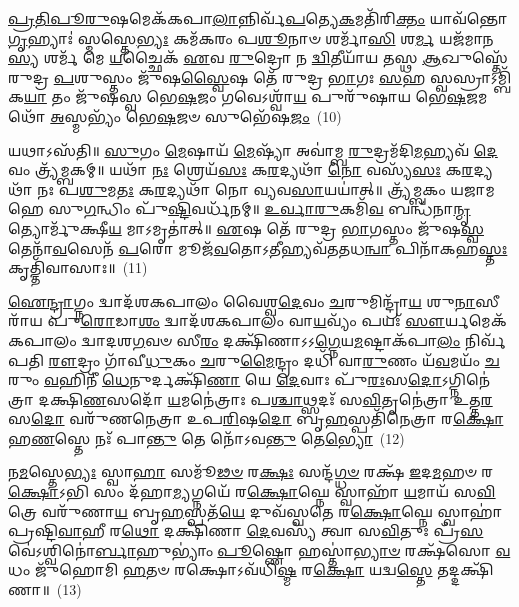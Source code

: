 {\anuvakamend[{𑌹\-\ul{𑌰𑍀} 𑌮𑌨𑍍𑌮᳴\-\ul{𑌭𑌿}\-𑌰𑌾 𑌚𑌤𑍁᳴𑌶𑍍𑌚𑌤𑍍𑌵𑌾𑌰𑌿𑍞𑌶𑌚𑍍𑌚}]}%

\-\ul{𑌪𑍍𑌰}\-\-\ul{𑌤𑌿}\-\-\ul{𑌪𑍂}\-\-\ul{𑌰𑍁}\-𑌷𑌮𑍇𑌕᳴𑌕𑌪𑌾\-\ul{𑌲𑌾}\-𑌨𑍍𑌨𑌿𑌰𑍍𑌵᳴\-\ul{𑌪}\-𑌤𑍍𑌯𑍇\-\ul{𑌕}\-𑌮𑌤𑌿᳴𑌰𑌿\-\ul{𑌕𑍍𑌤𑌂} 𑌯𑌾𑌵᳴𑌨𑍍𑌤𑍋 \ul{𑌗𑍃}\-𑌹𑍍𑌯𑌾𑌃॑ 𑌸𑍍𑌮𑌸𑍍𑌤𑍇\-\ul{𑌭𑍍𑌯𑌃} 𑌕𑌮᳴𑌕𑌰𑌂 𑌪\-\ul{𑌶𑍂}\-𑌨𑌾𑍞 𑌶𑌰𑍍𑌮𑌾᳴\-\ul{𑌸𑌿} 𑌶\-\ul{𑌰𑍍𑌮} 𑌯𑌜᳴𑌮𑌾𑌨\-\ul{𑌸𑍍𑌯} 𑌶𑌰𑍍𑌮᳴ 𑌮𑍇 \ul{𑌯}\-𑌚𑍍𑌛𑍈𑌕᳴ \ul{𑌏}\-𑌵 \ul{𑌰𑍁}\-𑌦𑍍𑌰𑍋 𑌨 \ul{𑌦𑍍𑌵𑌿}\-𑌤𑍀𑌯𑌾᳴𑌯 𑌤𑌸𑍍𑌥 \ul{𑌆}\-𑌖𑍁𑌸𑍍𑌤𑍇᳴ 𑌰𑍁𑌦𑍍𑌰 \ul{𑌪}\-𑌶𑍁𑌸𑍍𑌤𑌂 𑌜𑍁᳴𑌷\-\ul{𑌸𑍍𑌵𑍈}\-𑌷 𑌤𑍇᳴ 𑌰𑍁𑌦𑍍𑌰 \ul{𑌭𑌾}\-𑌗𑌃 \ul{𑌸}\-𑌹 𑌸𑍍𑌵𑌸𑍍𑌰𑌾\-𑌽𑌮𑍍𑌬𑌿᳴𑌕\-\ul{𑌯𑌾} 𑌤𑌂 𑌜𑍁᳴𑌷𑌸𑍍𑌵 𑌭𑍇\-\ul{𑌷}\-𑌜𑌂 𑌗𑌵𑍇\-𑌽𑌶𑍍𑌵𑌾᳴\-\ul{𑌯} 𑌪𑍁𑌰𑍁᳴𑌷𑌾𑌯 𑌭𑍇\-\ul{𑌷}\-𑌜𑌮𑌥𑍋᳴ \ul{𑌅}\-𑌸𑍍𑌮𑌭𑍍𑌯𑌂᳴ 𑌭𑍇\-\ul{𑌷}\-𑌜𑍞 𑌸𑍁𑌭𑍇᳴𑌷\-\ul{𑌜𑌂}\-~(10)

𑌯𑌥𑌾\-𑌽𑌸᳴𑌤𑌿॥ \ul{𑌸𑍁}\-𑌗𑌂 \ul{𑌮𑍇}\-𑌷𑌾𑌯᳴ \ul{𑌮𑍇}\-𑌷𑍍𑌯𑌾᳴ 𑌅𑌵𑌾॑𑌮𑍍𑌬 \ul{𑌰𑍁}\-𑌦𑍍𑌰𑌮᳴𑌦𑌿\-\ul{𑌮}\-𑌹𑍍𑌯𑌵᳴ \ul{𑌦𑍇}\-𑌵𑌂 𑌤𑍍𑌰𑍍𑌯᳴𑌮𑍍𑌬𑌕𑌮𑍍॥ 𑌯𑌥𑌾᳴ \ul{𑌨𑌃} 𑌶𑍍𑌰𑍇𑌯᳴\-\ul{𑌸𑌃} 𑌕\-\ul{𑌰}\-𑌦𑍍𑌯𑌥𑌾᳴ \ul{𑌨𑍋} 𑌵𑌸𑍍𑌯᳴\-\ul{𑌸𑌃} 𑌕\-\ul{𑌰}\-𑌦𑍍𑌯𑌥𑌾᳴ 𑌨𑌃 𑌪\-\ul{𑌶𑍁}\-𑌮\-\ul{𑌤𑌃} 𑌕\-\ul{𑌰}\-𑌦𑍍𑌯𑌥𑌾᳴ 𑌨𑍋 𑌵𑍍𑌯𑌵\-\ul{𑌸𑌾}\-𑌯𑌯𑌾॑𑌤𑍍॥ 𑌤𑍍𑌰𑍍𑌯᳴𑌮𑍍𑌬𑌕𑌂 𑌯𑌜𑌾𑌮𑌹𑍇 𑌸𑍁\-\ul{𑌗}\-𑌨𑍍𑌧𑌿𑌂 𑌪𑍁᳴\-\ul{𑌷𑍍𑌟𑌿}\-𑌵𑌰𑍍𑌧᳴𑌨𑌮𑍍॥ \ul{𑌉}\-\-\ul{𑌰𑍍𑌵𑌾}\-\-\ul{𑌰𑍁}\-𑌕𑌮𑌿᳴\-\ul{𑌵} 𑌬𑌨𑍍𑌧᳴𑌨𑌾\-\ul{𑌨𑍍𑌮𑍃}\-𑌤𑍍𑌯𑍋𑌰𑍍𑌮𑍁᳴𑌕𑍍𑌷𑍀\-\ul{𑌯} 𑌮𑌾\-𑌽𑌮𑍃𑌤𑌾॑𑌤𑍍॥ \ul{𑌏}\-𑌷 𑌤𑍇᳴ 𑌰𑍁𑌦𑍍𑌰 \ul{𑌭𑌾}\-𑌗𑌸𑍍𑌤𑌂 𑌜𑍁᳴𑌷\-\ul{𑌸𑍍𑌵} 𑌤𑍇𑌨𑌾᳴\-\ul{𑌵}\-𑌸𑍇𑌨᳴ \ul{𑌪}\-𑌰𑍋 𑌮𑍂𑌜᳴\-\ul{𑌵}\-𑌤𑍋\-𑌽\-\ul{𑌤𑍀}\-𑌹𑍍𑌯𑌵᳴𑌤𑌤𑌧\-\ul{𑌨𑍍𑌵𑌾} 𑌪𑌿𑌨𑌾᳴𑌕𑌹\-\ul{𑌸𑍍𑌤𑌃} 𑌕𑍃𑌤𑍍𑌤𑌿᳴𑌵𑌾𑌸𑌾𑌃॥~(11)

{\anuvakamend[{𑌸𑍁𑌭𑍇᳴𑌷𑌜𑌮𑌿\-\ul{𑌹𑌿} 𑌤𑍍𑌰𑍀𑌣𑌿᳴ 𑌚}]}%

\-\ul{𑌐}\-\-\ul{𑌨𑍍𑌦𑍍𑌰𑌾}\-𑌗𑍍𑌨𑌂 𑌦𑍍𑌵𑌾𑌦᳴𑌶\-𑌕𑌪𑌾𑌲𑌂 𑌵𑍈𑌶𑍍𑌵\-\ul{𑌦𑍇}\-𑌵𑌂 \ul{𑌚}\-𑌰𑍁𑌮𑌿𑌨𑍍𑌦𑍍𑌰𑌾᳴\-\ul{𑌯} 𑌶𑍁\-\ul{𑌨𑌾}\-𑌸𑍀𑌰𑌾᳴𑌯 𑌪𑍁\-\ul{𑌰𑍋}\-𑌡𑌾\-\ul{𑌶𑌂} 𑌦𑍍𑌵𑌾𑌦᳴𑌶\-𑌕𑌪𑌾𑌲𑌂 𑌵𑌾\-\ul{𑌯}\-𑌵𑍍𑌯𑌂᳴ 𑌪𑌯𑌃᳴ \ul{𑌸𑍗}\-𑌰𑍍𑌯𑌮𑍇𑌕᳴𑌕𑌪𑌾𑌲𑌂 𑌦𑍍𑌵𑌾𑌦𑌶\-\ul{𑌗}\-𑌵𑍞 𑌸𑍀\-\ul{𑌰𑌂} 𑌦𑌕𑍍𑌷𑌿᳴𑌣𑌾\-𑌽\-𑌽\-\ul{𑌗𑍍𑌨𑍇}\-𑌯\-\ul{𑌮}\-𑌷𑍍𑌟𑌾\-𑌕᳴𑌪𑌾\-\ul{𑌲𑌂} 𑌨𑌿𑌰𑍍𑌵᳴𑌪𑌤𑌿 \ul{𑌰𑍗}\-𑌦𑍍𑌰𑌂 𑌗𑌾᳴𑌵𑍀\-\ul{𑌧𑍁}\-𑌕𑌂 \ul{𑌚}\-𑌰𑍁\-\ul{𑌮𑍈}\-𑌨𑍍𑌦𑍍𑌰𑌂 𑌦𑌧𑌿᳴ 𑌵𑌾\-\ul{𑌰𑍁}\-𑌣𑌂 𑌯᳴\-\ul{𑌵}\-𑌮𑌯𑌂᳴ \ul{𑌚}\-𑌰𑍁𑌂 \ul{𑌵}\-𑌹𑌿𑌨𑍀᳴ \ul{𑌧𑍇}\-𑌨𑍁𑌰𑍍𑌦𑌕𑍍𑌷𑌿᳴\-\ul{𑌣𑌾} 𑌯𑍇 \ul{𑌦𑍇}\-𑌵𑌾𑌃 𑌪𑍁᳴\-\ul{𑌰𑌃}\-𑌸\-\ul{𑌦𑍋}\-\-𑌽𑌗𑍍𑌨𑌿𑌨𑍇॑𑌤𑍍𑌰𑌾 𑌦𑌕𑍍𑌷𑌿\-\ul{𑌣}\-𑌸𑌦𑍋᳴ \ul{𑌯}\-𑌮𑌨𑍇॑𑌤𑍍𑌰𑌾𑌃 𑌪\-\ul{𑌶𑍍𑌚𑌾}\-𑌥𑍍𑌸𑌦𑌃᳴ 𑌸\-\ul{𑌵𑌿}\-𑌤𑍃𑌨𑍇॑𑌤𑍍𑌰𑌾 𑌉𑌤𑍍𑌤\-\ul{𑌰}\-𑌸\-\ul{𑌦𑍋} 𑌵𑌰𑍁᳴𑌣𑌨𑍇𑌤𑍍𑌰𑌾 𑌉𑌪\-\ul{𑌰𑌿}\-𑌷\-\ul{𑌦𑍋} 𑌬𑍃\-\ul{𑌹}\-𑌸𑍍𑌪𑌤𑌿᳴𑌨𑍇𑌤𑍍𑌰𑌾 𑌰\-\ul{𑌕𑍍𑌷𑍋}\-𑌹\-\ul{𑌣}\-𑌸𑍍𑌤𑍇 𑌨𑌃᳴ 𑌪𑌾\-\ul{𑌨𑍍𑌤𑍁} 𑌤𑍇 𑌨𑍋᳴\-𑌽𑌵\-\ul{𑌨𑍍𑌤𑍁} 𑌤𑍇\-\ul{𑌭𑍍𑌯𑍋}\-~(12)

𑌨\-\ul{𑌮}\-𑌸𑍍𑌤𑍇\-\ul{𑌭𑍍𑌯𑌃} 𑌸𑍍𑌵𑌾\-\ul{𑌹𑌾} 𑌸𑌮𑍂᳴\-\ul{𑌢}\-\-\ul{𑍞} 𑌰\-\ul{𑌕𑍍𑌷𑌃} 𑌸𑌨𑍍𑌦᳴\-\ul{𑌗𑍍𑌧}\-\-\ul{𑍞} 𑌰𑌕𑍍𑌷᳴ \ul{𑌇}\-𑌦\-\ul{𑌮}\-𑌹𑍞 𑌰\-\ul{𑌕𑍍𑌷𑍋}\-\-𑌽𑌭𑌿 𑌸𑌂 𑌦᳴𑌹𑌾\-\ul{𑌮𑍍𑌯}\-𑌗𑍍𑌨𑌯𑍇᳴ 𑌰\-\ul{𑌕𑍍𑌷𑍋}\-𑌘𑍍𑌨𑍇 𑌸𑍍𑌵𑌾𑌹𑌾᳴ \ul{𑌯}\-𑌮𑌾𑌯᳴ 𑌸\-\ul{𑌵𑌿}\-𑌤𑍍𑌰𑍇 𑌵𑌰𑍁᳴𑌣𑌾\-\ul{𑌯} 𑌬𑍃\-\ul{𑌹}\-𑌸𑍍𑌪𑌤᳴\-\ul{𑌯𑍇} 𑌦𑍁𑌵᳴𑌸𑍍𑌵𑌤𑍇 𑌰\-\ul{𑌕𑍍𑌷𑍋}\-𑌘𑍍𑌨𑍇 𑌸𑍍𑌵𑌾𑌹𑌾॑ 𑌪𑍍𑌰𑌷𑍍𑌟𑌿\-\ul{𑌵𑌾}\-𑌹𑍀 𑌰\-\ul{𑌥𑍋} 𑌦𑌕𑍍𑌷𑌿᳴𑌣𑌾 \ul{𑌦𑍇}\-𑌵𑌸𑍍𑌯᳴ 𑌤𑍍𑌵𑌾 𑌸\-\ul{𑌵𑌿}\-𑌤𑍁𑌃 𑌪𑍍𑌰᳴\-\ul{𑌸}\-𑌵𑍇॑\-𑌽𑌶𑍍𑌵𑌿𑌨𑍋॑\-\ul{𑌰𑍍𑌬𑌾}\-𑌹𑍁\-𑌭𑍍𑌯𑌾𑌂॑ \ul{𑌪𑍂}\-𑌷𑍍𑌣𑍋 𑌹𑌸𑍍𑌤𑌾॑\-\ul{𑌭𑍍𑌯𑌾}\-\-\ul{𑍞} 𑌰𑌕𑍍𑌷᳴𑌸𑍋 \ul{𑌵}\-𑌧𑌂 𑌜𑍁᳴𑌹𑍋𑌮𑌿 \ul{𑌹}\-𑌤𑍞 𑌰𑌕𑍍𑌷𑍋\-𑌽𑌵᳴𑌧𑌿\-\ul{𑌷𑍍𑌮} 𑌰\-\ul{𑌕𑍍𑌷𑍋} 𑌯𑌦𑍍𑌵\-\ul{𑌸𑍍𑌤𑍇} 𑌤𑌦𑍍𑌦𑌕𑍍𑌷𑌿᳴𑌣𑌾॥~(13)


